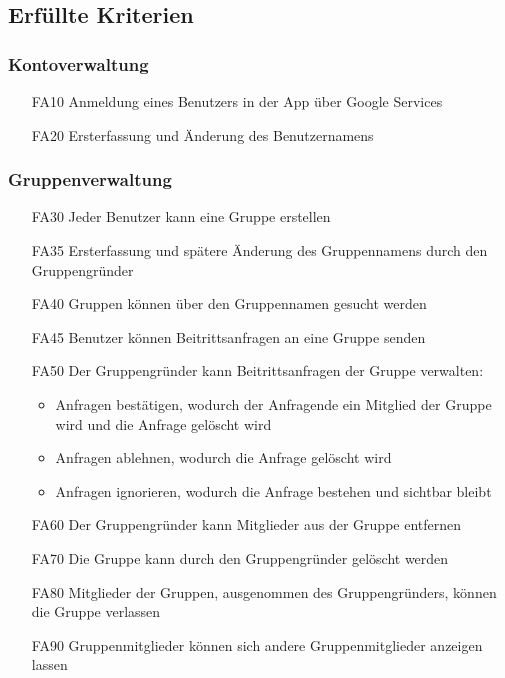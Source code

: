 \documentclass{scrartcl}
\begin{document}
	\subsection{Erfüllte Kriterien}
	\subsubsection{Kontoverwaltung}
	\begin{itemize}
		\item[FA10] Anmeldung eines Benutzers in der App über Google Services
		\item[FA20] Ersterfassung und Änderung des Benutzernamens
	\end{itemize}
	\subsubsection{Gruppenverwaltung}
		\begin{itemize}
			
			\item[FA30] Jeder Benutzer kann eine Gruppe erstellen
			
			\item[FA35] Ersterfassung und spätere Änderung des Gruppennamens durch den Gruppengründer
			
			\item[FA40] Gruppen können über den Gruppennamen gesucht werden
			
			\item[FA45] Benutzer können Beitrittsanfragen an eine Gruppe senden
			
			\item[FA50] Der Gruppengründer kann Beitrittsanfragen der Gruppe verwalten:
			\begin{itemize}
				\item Anfragen bestätigen, wodurch der Anfragende ein Mitglied der Gruppe wird und die Anfrage gelöscht wird
			\end{itemize}
			\begin{itemize}
				\item Anfragen ablehnen, wodurch die Anfrage gelöscht wird
			\end{itemize}
			\begin{itemize}
				\item Anfragen ignorieren, wodurch die Anfrage bestehen und sichtbar bleibt
			\end{itemize}
			
			\item[FA60] Der Gruppengründer kann Mitglieder aus der Gruppe entfernen
			
			\item[FA70] Die Gruppe kann durch den Gruppengründer gelöscht werden
			
			\item[FA80] Mitglieder der Gruppen, ausgenommen des Gruppengründers, können die Gruppe verlassen
			
			\item[FA90] Gruppenmitglieder können sich andere Gruppenmitglieder anzeigen lassen
	
			\end{itemize}
	
\end{document}
